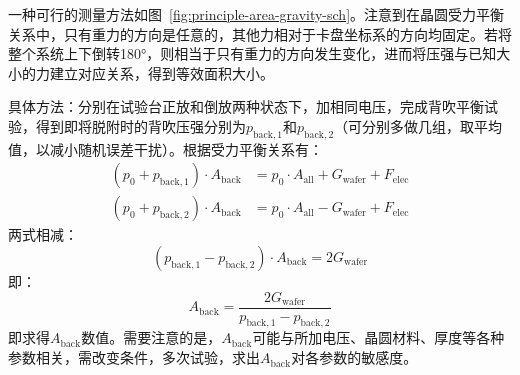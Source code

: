 一种可行的测量方法如图~\ref{fig:principle-area-gravity-sch}。注意到在晶圆受力平衡关系中，只有重力的方向是任意的，其他力相对于卡盘坐标系的方向均固定。若将整个系统上下倒转\ang{180}，则相当于只有重力的方向发生变化，进而将压强与已知大小的力建立对应关系，得到等效面积大小。

具体方法：分别在试验台正放和倒放两种状态下，加相同电压，完成背吹平衡试验，得到即将脱附时的背吹压强分别为$p_{\mathrm{back},1}$和$p_{\mathrm{back},2}$（可分别多做几组，取平均值，以减小随机误差干扰）。根据受力平衡关系有：
\begin{equation}
\label{eq:principle-area-gravity-orig}
\begin{aligned}
(p_{0} + p_{\mathrm{back},1}) \cdot A_{\mathrm{back}} & = p_0 \cdot A_{\mathrm{all}} + G_{\mathrm{wafer}} + F_{\mathrm{elec}} \\
(p_{0} + p_{\mathrm{back},2}) \cdot A_{\mathrm{back}} & = p_0 \cdot A_{\mathrm{all}} - G_{\mathrm{wafer}} + F_{\mathrm{elec}}
\end{aligned}
\end{equation}
两式相减：
\[
(p_{\mathrm{back},1} - p_{\mathrm{back},2}) \cdot A_{\mathrm{back}} = 2 G_{\mathrm{wafer}}
\]
即：
\begin{equation}
\label{eq:principle-area-gravity-derived}
A_{\mathrm{back}} = \frac{2 G_{\mathrm{wafer}}}{p_{\mathrm{back},1} - p_{\mathrm{back},2}}
\end{equation}
即求得$A_{\mathrm{back}}$数值。需要注意的是，$A_{\mathrm{back}}$可能与所加电压、晶圆材料、厚度等各种参数相关，需改变条件，多次试验，求出$A_{\mathrm{back}}$对各参数的敏感度。




